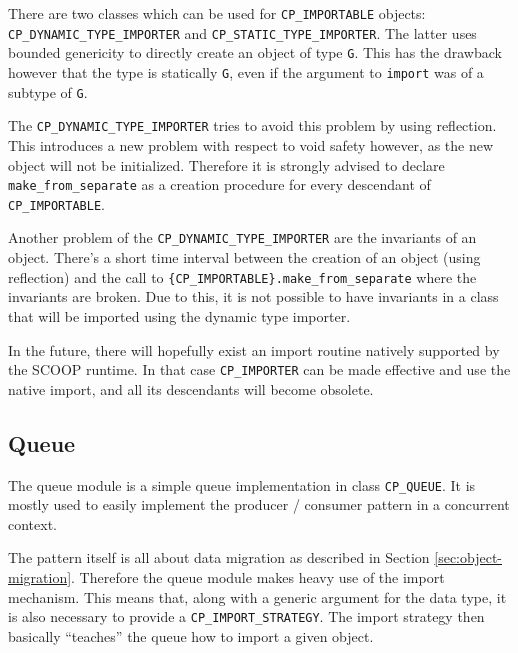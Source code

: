 \documentclass[a4paper,10pt]{article}
\begin{document}
There are two classes which can be used for \lstinline!CP_IMPORTABLE! objects: \lstinline!CP_DYNAMIC_TYPE_IMPORTER! and \lstinline!CP_STATIC_TYPE_IMPORTER!.
The latter uses bounded genericity to directly create an object of type \lstinline!G!.
This has the drawback however that the type is statically \lstinline!G!, even if the argument to \lstinline!import! was of a subtype of \lstinline!G!.

The \lstinline!CP_DYNAMIC_TYPE_IMPORTER! tries to avoid this problem by using reflection.
This introduces a new problem with respect to void safety however, as the new object will not be initialized.
Therefore it is strongly advised to declare \lstinline!make_from_separate! as a creation procedure for every descendant of \lstinline!CP_IMPORTABLE!.

Another problem of the \lstinline!CP_DYNAMIC_TYPE_IMPORTER! are the invariants of an object.
There's a short time interval between the creation of an object (using reflection) and the call to \lstinline!{CP_IMPORTABLE}.make_from_separate! where the invariants are broken.
Due to this, it is not possible to have invariants in a class that will be imported using the dynamic type importer.

In the future, there will hopefully exist an import routine natively supported by the SCOOP runtime.
In that case \lstinline!CP_IMPORTER! can be made effective and use the native import, and all its descendants will become obsolete.



\subsection{Queue}

The queue module is a simple queue implementation in class \lstinline!CP_QUEUE!.
It is mostly used to easily implement the producer / consumer pattern in a concurrent context.


The pattern itself is all about data migration as described in Section \ref{sec:object-migration}.
Therefore the queue module makes heavy use of the import mechanism.
This means that, along with a generic argument for the data type, it is also necessary to provide a \lstinline!CP_IMPORT_STRATEGY!.
The import strategy then basically ``teaches'' the queue how to import a given object.
\end{document}
